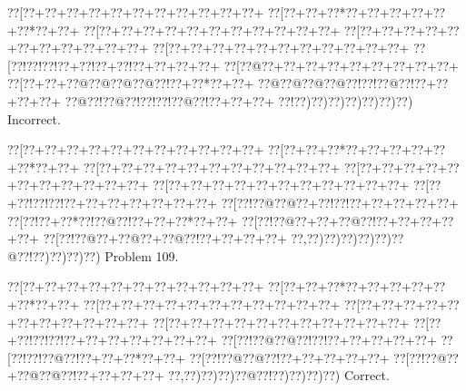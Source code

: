 \documentclass[a5paper]{article}
\begin{document}
\begin{center}
{\goo
\0??[\0??+\0??+\0??+\0??+\0??+\0??+\0??+\0??+\0??+\0??+\0??+
\0??[\0??+\0??+\0??*\0??+\0??+\0??+\0??+\0??+\0??*\0??+\0??+
\0??[\0??+\0??+\0??+\0??+\0??+\0??+\0??+\0??+\0??+\0??+\0??+
\0??[\0??+\0??+\0??+\0??+\0??+\0??+\0??+\0??+\0??+\0??+\0??+
\0??[\0??+\0??+\0??+\0??+\0??+\0??+\0??+\0??+\0??+\0??+\0??+
\0??[\0??!\0??!\0??!\0??+\0??!\0??+\0??!\0??+\0??+\0??+\0??+
\0??[\0??@\0??+\0??+\0??+\0??+\0??+\0??+\0??+\0??+\0??+
\0??[\0??+\0??+\0??@\0??@\0??@\0??@\0??!\0??+\0??*\0??+\0??+
\0??@\0??@\0??@\0??@\0??!\0??!\0??@\0??!\0??+\0??+\0??+\0??+
\0??@\0??!\0??@\0??!\0??!\0??!\0??@\0??!\0??+\0??+\0??+
\0??!\0??)\0??)\0??)\0??)\0??)\0??)\0??)
}
Incorrect. 

\end{center}
\newpage
\begin{center}
{\goo
\0??[\0??+\0??+\0??+\0??+\0??+\0??+\0??+\0??+\0??+\0??+\0??+
\0??[\0??+\0??+\0??*\0??+\0??+\0??+\0??+\0??+\0??*\0??+\0??+
\0??[\0??+\0??+\0??+\0??+\0??+\0??+\0??+\0??+\0??+\0??+\0??+
\0??[\0??+\0??+\0??+\0??+\0??+\0??+\0??+\0??+\0??+\0??+\0??+
\0??[\0??+\0??+\0??+\0??+\0??+\0??+\0??+\0??+\0??+\0??+\0??+
\0??[\0??+\0??!\0??!\0??!\0??+\0??+\0??+\0??+\0??+\0??+\0??+
\0??[\0??!\0??@\0??@\0??+\0??!\0??!\0??+\0??+\0??+\0??+\0??+
\0??[\0??!\0??+\0??*\0??!\0??@\0??!\0??+\0??+\0??*\0??+\0??+
\0??[\0??!\0??@\0??+\0??+\0??@\0??!\0??+\0??+\0??+\0??+\0??+
\0??[\0??!\0??@\0??+\0??@\0??+\0??@\0??!\0??+\0??+\0??+\0??+
\0??,\0??)\0??)\0??)\0??)\0??)\0??@\0??!\0??)\0??)\0??)\0??)
}
Problem 109.

\end{center}
\begin{center}
{\goo
\0??[\0??+\0??+\0??+\0??+\0??+\0??+\0??+\0??+\0??+\0??+\0??+
\0??[\0??+\0??+\0??*\0??+\0??+\0??+\0??+\0??+\0??*\0??+\0??+
\0??[\0??+\0??+\0??+\0??+\0??+\0??+\0??+\0??+\0??+\0??+\0??+
\0??[\0??+\0??+\0??+\0??+\0??+\0??+\0??+\0??+\0??+\0??+\0??+
\0??[\0??+\0??+\0??+\0??+\0??+\0??+\0??+\0??+\0??+\0??+\0??+
\0??[\0??+\0??!\0??!\0??!\0??+\0??+\0??+\0??+\0??+\0??+\0??+
\0??[\0??!\0??@\0??@\0??!\0??!\0??+\0??+\0??+\0??+\0??+
\0??[\0??!\0??!\0??@\0??!\0??+\0??+\0??*\0??+\0??+
\0??[\0??!\0??@\0??@\0??!\0??+\0??+\0??+\0??+\0??+
\0??[\0??!\0??@\0??+\0??@\0??@\0??!\0??+\0??+\0??+\0??+
\0??,\0??)\0??)\0??)\0??@\0??!\0??)\0??)\0??)\0??)
}
Correct. 

\end{center}
\end{document}
